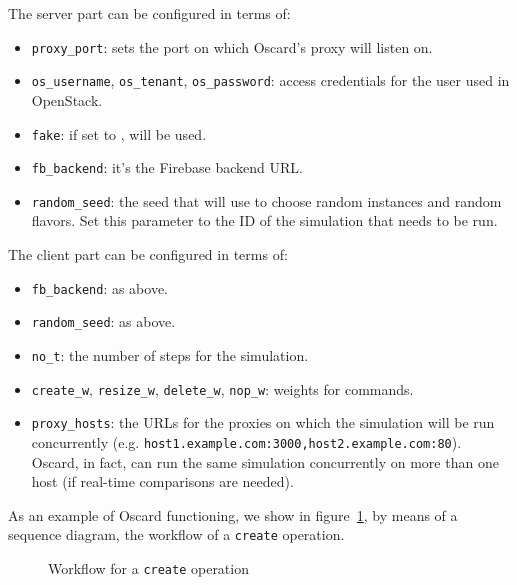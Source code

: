 The server part can be configured in terms of:
\begin{itemize}
	\item \texttt{proxy\_port}: sets the port on which Oscard's proxy will listen on.
	\item \texttt{os\_username}, \texttt{os\_tenant}, \texttt{os\_password}: access credentials for the user used in OpenStack.
	\item \texttt{fake}: if set to ,  will be used.
	\item \texttt{fb\_backend}: it's the Firebase backend URL.
	\item \texttt{random\_seed}: the seed that  will use to choose random instances and random flavors. Set this parameter to the ID of the simulation that needs to be run.
\end{itemize}

The client part can be configured in terms of:
\begin{itemize}
	\item \texttt{fb\_backend}: as above.
	\item \texttt{random\_seed}: as above.
	\item \texttt{no\_t}: the number of steps for the simulation.
	\item \texttt{create\_w}, \texttt{resize\_w}, \texttt{delete\_w}, \texttt{nop\_w}: weights for commands.
	\item \texttt{proxy\_hosts}: the URLs for the proxies on which the simulation will be run concurrently (e.g. \texttt{host1.example.com:3000,host2.example.com:80}). Oscard, in fact, can run the same simulation concurrently on more than one host (if real-time comparisons are needed).
\end{itemize}

As an example of Oscard functioning, we show in figure~\ref{fig:oscard_functioning}, by means of a sequence diagram, the workflow of a \texttt{create} operation. 


\begin{figure}[!ht]
\label{fig:oscard_functioning}
\caption{Workflow for a \texttt{create} operation}
\end{figure}


